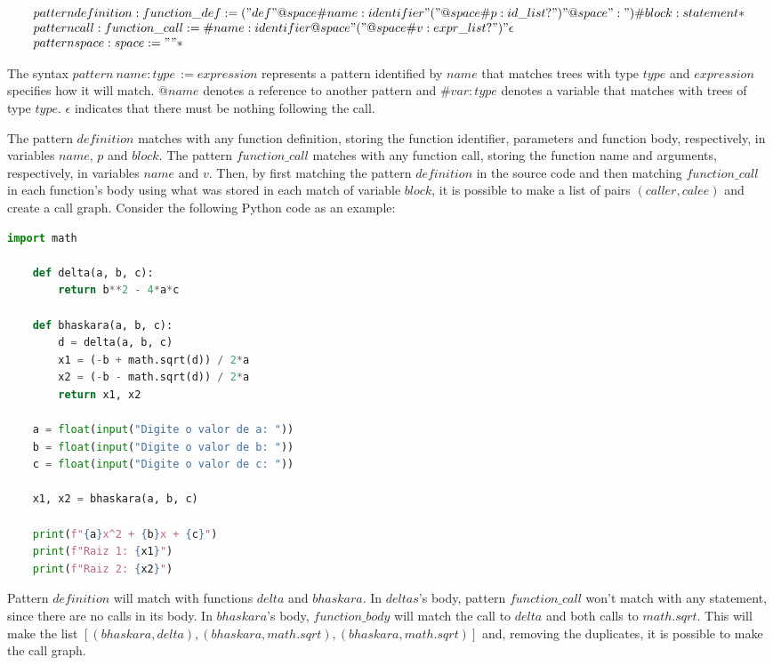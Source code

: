 \[
    \begin{array}{l}
        pattern definition : function\_def := ("def" @space \#name:identifier "(" @space \#p:id\_list? ")" @space ":") \#block:statement*
        \\
        pattern call : function\_call := \#name:identifier @space "(" @space \#v:expr\_list? ")" \epsilon
        \\
        pattern space : space := " "*
        \\
    \end{array}
\]

The syntax \(pattern \: name : type \, := expression\) represents a pattern 
identified by \(name\) that matches trees with type \(type\) and \(expression\)
specifies how it will match. \(@name\) denotes a reference to another pattern
and \(\#var:type\) denotes a variable that matches with trees of type \(type\).
\textit{\(\epsilon\)} indicates that there must be nothing following the call.

The pattern \(definition\) matches with any function definition, storing the
function identifier, parameters and function body, respectively, in variables \(name\),
\(p\) and \(block\). The pattern \(function\_call\) matches with any function 
call, storing the function name and arguments, respectively, in variables \(name\)
and \(v\). Then, by first matching the pattern \(definition\) in the source code
and then matching \(function\_call\) in each function's body using what was stored in
each match of variable \(block\), it is possible to make a list of pairs \((caller, calee)\)
and create a call graph. Consider the following Python code as an example:


\begin{lstlisting}[language=Python]
    import math

    def delta(a, b, c):
        return b**2 - 4*a*c

    def bhaskara(a, b, c):
        d = delta(a, b, c)
        x1 = (-b + math.sqrt(d)) / 2*a
        x2 = (-b - math.sqrt(d)) / 2*a
        return x1, x2

    a = float(input("Digite o valor de a: "))
    b = float(input("Digite o valor de b: "))
    c = float(input("Digite o valor de c: "))

    x1, x2 = bhaskara(a, b, c)

    print(f"{a}x^2 + {b}x + {c}")
    print(f"Raiz 1: {x1}")
    print(f"Raiz 2: {x2}")
\end{lstlisting}

Pattern \(definition\) will match with functions \(delta\) and \(bhaskara\). In 
\(deltas\)'s body, pattern \(function\_call\) won't match with any statement, 
since there are no calls in its body. In \(bhaskara\)'s body, \(function\_body\)
will match the call to \(delta\) and both calls to \(math.sqrt\). This will make
the list \([(bhaskara, delta), (bhaskara, math.sqrt), (bhaskara, math.sqrt)]\)
and, removing the duplicates, it is possible to make the call graph.

